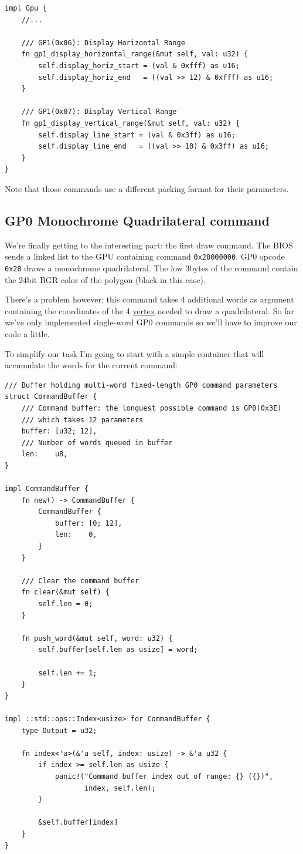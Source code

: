 \documentclass[a4paper]{article}
\newcommand{\code}[1] {\texttt{#1}}
\begin{document}
\begin{lstlisting}
impl Gpu {
    //...

    /// GP1(0x06): Display Horizontal Range
    fn gp1_display_horizontal_range(&mut self, val: u32) {
        self.display_horiz_start = (val & 0xfff) as u16;
        self.display_horiz_end   = ((val >> 12) & 0xfff) as u16;
    }

    /// GP1(0x07): Display Vertical Range
    fn gp1_display_vertical_range(&mut self, val: u32) {
        self.display_line_start = (val & 0x3ff) as u16;
        self.display_line_end   = ((val >> 10) & 0x3ff) as u16;
    }
}
\end{lstlisting}

Note that those commands use a different packing format for their
parameters.

\subsection{GP0 Monochrome Quadrilateral command}

We're finally getting to the interesting part: the first draw
command. The BIOS sends a linked list to the GPU containing command
\code{0x28000000}. GP0 opcode \code{0x28} draws a monochrome
quadrilateral. The low 3bytes of the command contain the 24bit BGR
color of the polygon (black in this case).

There's a problem however: this command takes 4 additional words as
argument containing the coordinates of the 4
\href{https://en.wikipedia.org/wiki/Vertex_%28geometry%29}{vertex}
needed to draw a quadrilateral. So far we've only implemented
single-word GP0 commands so we'll have to improve our code a little.

To simplify our task I'm going to start with a simple container that
will accumulate the words for the current command:

\begin{lstlisting}
/// Buffer holding multi-word fixed-length GP0 command parameters
struct CommandBuffer {
    /// Command buffer: the longuest possible command is GP0(0x3E)
    /// which takes 12 parameters
    buffer: [u32; 12],
    /// Number of words queued in buffer
    len:    u8,
}

impl CommandBuffer {
    fn new() -> CommandBuffer {
        CommandBuffer {
            buffer: [0; 12],
            len:    0,
        }
    }

    /// Clear the command buffer
    fn clear(&mut self) {
        self.len = 0;
    }

    fn push_word(&mut self, word: u32) {
        self.buffer[self.len as usize] = word;

        self.len += 1;
    }
}

impl ::std::ops::Index<usize> for CommandBuffer {
    type Output = u32;

    fn index<'a>(&'a self, index: usize) -> &'a u32 {
        if index >= self.len as usize {
            panic!("Command buffer index out of range: {} ({})",
                   index, self.len);
        }

        &self.buffer[index]
    }
}
\end{lstlisting}
\end{document}
